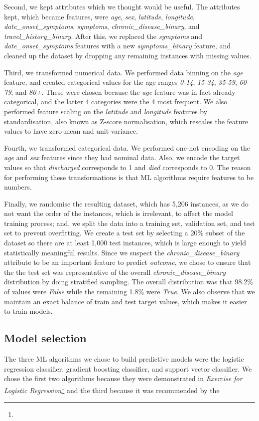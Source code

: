 \documentclass[twoside,11pt]{article}
\begin{document}
Second, we kept attributes which we thought would be useful. The attributes kept, which became features, were \emph{age}, \emph{sex}, \emph{latitude}, \emph{longitude}, \emph{date\_onset\_symptoms}, \emph{symptoms}, \emph{chronic\_disease\_binary}, and \emph{travel\_history\_binary}. After this, we replaced the \emph{symptoms} and \emph{date\_onset\_symptoms} features with a new \emph{symptoms\_binary} feature, and cleaned up the dataset by dropping any remaining instances with missing values. 

Third, we transformed numerical data. We performed data binning on the \emph{age} feature, and created categorical values for the age ranges \emph{0-14}, \emph{15-34}, \emph{35-59}, \emph{60-79}, and \emph{80+}. These were chosen because the \emph{age} feature was in fact already categorical, and the latter 4 categories were the 4 most frequent. We also performed feature scaling on the \emph{latitude} and \emph{longitude} features by standardisation, also known as Z-score normalisation, which rescales the feature values to have zero-mean and unit-variance.  

Fourth, we transformed categorical data. We performed one-hot encoding on the \emph{age} and \emph{sex} features since they had nominal data. Also, we encode the target values so that \emph{discharged} corresponds to 1 and \emph{died} corresponds to 0. The reason for performing these transformations is that ML algorithms require features to be numbers. 

Finally, we randomise the resulting dataset, which has 5,206 instances, as we do not want the order of the instances, which is irrelevant, to affect the model training process; and, we split the data into a training set, validation set, and test set to prevent overfitting. We create a test set by selecting a 20\% subset of the dataset so there are at least 1,000 test instances, which is large enough to yield statistically meaningful results. Since we suspect the \emph{chronic\_disease\_binary} attribute to be an important feature to predict \emph{outcome}, we chose to ensure that the the test set was representative of the overall \emph{chronic\_disease\_binary} distribution by doing stratified sampling. The overall distribution was that 98.2\% of values were \emph{False} while the remaining 1.8\% were \emph{True}. We also observe that we maintain an exact balance of train and test target values, which makes it easier to train models.

\subsection{Model selection}
The three ML algorithms we chose to build predictive models were the logistic regression classifier, gradient boosting classifier, and support vector classifier. We chose the first two algorithms because they were demonstrated in \emph{Exercise for Logistic Regression}\footnote{} and the third because it was recommended by the 
\end{document}
